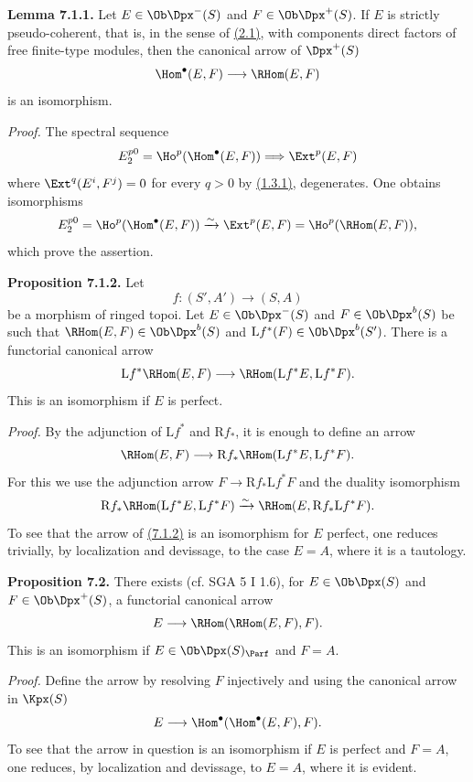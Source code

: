 \textbf{Lemma 7.1.1.} Let \(E\in\Ob\Dpx^-(S)\) and \(F\in\Ob\Dpx^+(S)\). If \(E\) is strictly pseudo-coherent, that is, in the sense of \hyperlink{sga6.e01.def.2-1}{(2.1)}, with components direct factors of free finite-type modules, then the canonical arrow of \(\Dpx^+(S)\)
\[
  \Hom^\bullet(E,F)\longrightarrow \RHom(E,F)
\]
is an isomorphism.

\emph{Proof.} The spectral sequence
\[
  E_2^{p0}=\Ho^p(\Hom^\bullet(E,F))
  \Longrightarrow \Ext^p(E,F)
\]
where \(\Ext^q(E^i,F^j)=0\) for every \(q>0\) by \hyperlink{sga6.e01.lem.1-3-1}{(1.3.1)}, degenerates. One obtains isomorphisms
\[
  E_2^{p0}=\Ho^p(\Hom^\bullet(E,F))
  \xrightarrow{\sim}\Ext^p(E,F)=\Ho^p(\RHom(E,F)),
\]
which prove the assertion.

\textbf{Proposition 7.1.2.} Let
\[
  f:(S',A')\longrightarrow(S,A)
\]
be a morphism of ringed topoi. Let \(E\in\Ob\Dpx^-(S)\) and \(F\in\Ob\Dpx^b(S)\) be such that \(\RHom(E,F)\in\Ob\Dpx^b(S)\) and \(\mathrm Lf^*(F)\in\Ob\Dpx^b(S')\). There is a functorial canonical arrow
\[
  \mathrm Lf^*\RHom(E,F)
  \longrightarrow
  \RHom(\mathrm Lf^*E,\mathrm Lf^*F).
\]
This is an isomorphism if \(E\) is perfect.

\emph{Proof.} By the adjunction of \(\mathrm Lf^*\) and \(\mathrm Rf_*\), it is enough to define an arrow
\[
  \RHom(E,F)
  \longrightarrow
  \mathrm Rf_*\RHom(\mathrm Lf^*E,\mathrm Lf^*F).
\]
For this we use the adjunction arrow \(F\to\mathrm Rf_*\mathrm Lf^*F\) and the duality isomorphism
\[
  \mathrm Rf_*\RHom(\mathrm Lf^*E,\mathrm Lf^*F)
  \xrightarrow{\sim}
  \RHom(E,\mathrm Rf_*\mathrm Lf^*F).
\]
To see that the arrow of \hyperlink{sga6.e01.prop.7-1-2}{(7.1.2)} is an isomorphism for \(E\) perfect, one reduces trivially, by localization and devissage, to the case \(E=A\), where it is a tautology.

\textbf{Proposition 7.2.} There exists (cf. SGA 5 I 1.6), for \(E\in\Ob\Dpx(S)\) and \(F\in\Ob\Dpx^+(S)\), a functorial canonical arrow
\[
  E\longrightarrow\RHom(\RHom(E,F),F).
\]
This is an isomorphism if \(E\in\Ob\Dpx(S)_{\Parf}\) and \(F=A\).

\emph{Proof.} Define the arrow by resolving \(F\) injectively and using the canonical arrow in \(\Kpx(S)\)
\[
  E\longrightarrow \Hom^\bullet(\Hom^\bullet(E,F),F).
\]
To see that the arrow in question is an isomorphism if \(E\) is perfect and \(F=A\), one reduces, by localization and devissage, to \(E=A\), where it is evident.

